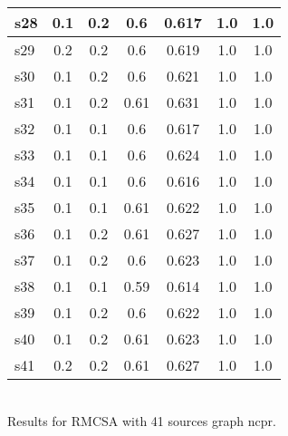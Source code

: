 \documentclass{article}
\begin{document}
\begin{tabular}{|l|c|c|c|c|c|c|}
\hline
s28 &0.1 & 0.2 & 0.6 & 0.617 & 1.0 & 1.0\\
\hline
s29 &0.2 & 0.2 & 0.6 & 0.619 & 1.0 & 1.0\\
\hline
s30 &0.1 & 0.2 & 0.6 & 0.621 & 1.0 & 1.0\\
\hline
s31 &0.1 & 0.2 & 0.61 & 0.631 & 1.0 & 1.0\\
\hline
s32 &0.1 & 0.1 & 0.6 & 0.617 & 1.0 & 1.0\\
\hline
s33 &0.1 & 0.1 & 0.6 & 0.624 & 1.0 & 1.0\\
\hline
s34 &0.1 & 0.1 & 0.6 & 0.616 & 1.0 & 1.0\\
\hline
s35 &0.1 & 0.1 & 0.61 & 0.622 & 1.0 & 1.0\\
\hline
s36 &0.1 & 0.2 & 0.61 & 0.627 & 1.0 & 1.0\\
\hline
s37 &0.1 & 0.2 & 0.6 & 0.623 & 1.0 & 1.0\\
\hline
s38 &0.1 & 0.1 & 0.59 & 0.614 & 1.0 & 1.0\\
\hline
s39 &0.1 & 0.2 & 0.6 & 0.622 & 1.0 & 1.0\\
\hline
s40 &0.1 & 0.2 & 0.61 & 0.623 & 1.0 & 1.0\\
\hline
s41 &0.2 & 0.2 & 0.61 & 0.627 & 1.0 & 1.0\\
\hline
\end{tabular}\\

\noindent Results for RMCSA with 41 sources graph ncpr.
\end{document}
